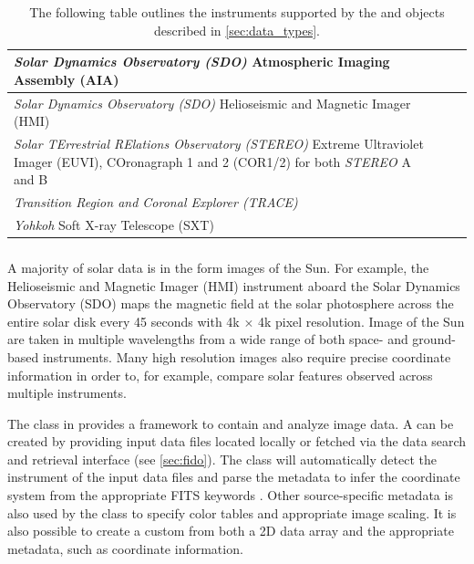 \begin{table}
\begin{center}
\begin{tabular}{|p{12cm}|c|c|}
\hline
\textit{Solar Dynamics Observatory (SDO)} Atmospheric Imaging Assembly (AIA) & \citet{lemen2012} \\
\hline
\textit{Solar Dynamics Observatory (SDO)} Helioseismic and Magnetic Imager (HMI) & \citet{schou12}  \\
\hline
\textit{Solar TErrestrial RElations Observatory (STEREO)} Extreme Ultraviolet Imager (EUVI), COronagraph 1 and 2 (COR1/2) for both \textit{STEREO} A and B & \citet{howard2008sun} \\
\hline
\textit{Transition Region and Coronal Explorer (TRACE)}  & \citet{handy99}  \\
\hline
\textit{Yohkoh} Soft X-ray Telescope (SXT) & \citet{tsuneta1991soft}  \\
\hline
\end{tabular}
\end{center}
\caption{The following table outlines the instruments supported by the \Timeseries and \Map objects described in \autoref{sec:data_types}.}
\label{tab:instruments}
\end{table}

\subsubsection{\Map}
\label{sec:map}
A majority of solar data is in the form images of the Sun.
For example, the Helioseismic and Magnetic Imager (HMI) instrument aboard the Solar Dynamics Observatory (SDO) maps the magnetic field at the solar photosphere across the entire solar disk every 45 seconds with 4k $\times$ 4k pixel resolution.
Image of the Sun are taken in multiple wavelengths from a wide range of both space- and ground- based instruments.
Many high resolution images also require precise coordinate information in order to, for example, compare solar features observed across multiple instruments.

The \Map class in \sunpypkg provides a framework to contain and analyze image data.
A \Map can be created by providing input data files located locally or fetched via the \sunpypkg data search and retrieval interface \Fido (see \autoref{sec:fido}).
The \Map class will automatically detect the instrument of the input data files and parse the metadata to infer the coordinate system from the appropriate FITS keywords \citep{refId0, 2006A&A...449..791T}.
Other source-specific metadata is also used by the \Map class to specify color tables and appropriate image scaling.
It is also possible to create a custom \Map from both a 2D data array and the appropriate metadata, such as coordinate information.

